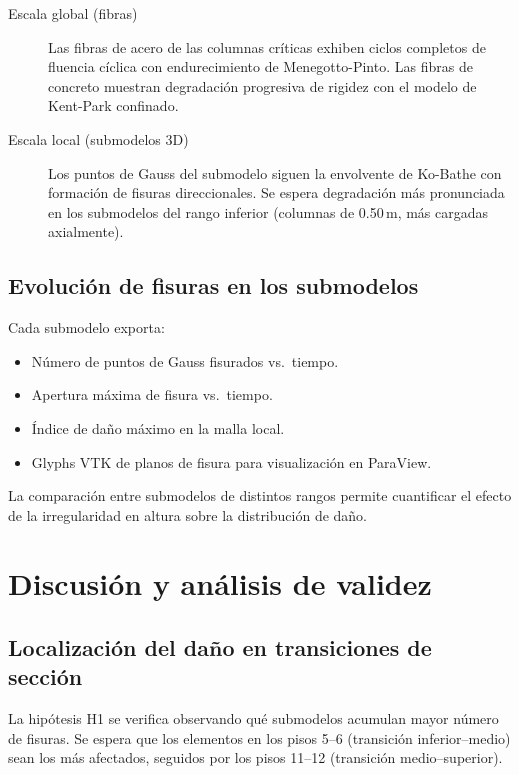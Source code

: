 \begin{description}
  \item[Escala global (fibras)]
    Las fibras de acero de las columnas críticas exhiben ciclos
    completos de fluencia cíclica con endurecimiento de Menegotto-Pinto.
    Las fibras de concreto muestran degradación progresiva de rigidez
    con el modelo de Kent-Park confinado.
  \item[Escala local (submodelos 3D)]
    Los puntos de Gauss del submodelo siguen la envolvente de
    Ko-Bathe con formación de fisuras direccionales.  Se espera
    degradación más pronunciada en los submodelos del rango inferior
    (columnas de 0.50\,m, más cargadas axialmente).
\end{description}

\subsection{Evolución de fisuras en los submodelos}

Cada submodelo exporta:
\begin{itemize}
  \item Número de puntos de Gauss fisurados vs.\ tiempo.
  \item Apertura máxima de fisura vs.\ tiempo.
  \item Índice de daño máximo en la malla local.
  \item Glyphs VTK de planos de fisura para visualización en ParaView.
\end{itemize}

La comparación entre submodelos de distintos rangos permite cuantificar
el efecto de la irregularidad en altura sobre la distribución de daño.


\section{Discusión y análisis de validez}
\label{sec:ms16-discussion}

\subsection{Localización del daño en transiciones de sección}

La hipótesis H1 se verifica observando qué submodelos acumulan mayor
número de fisuras.  Se espera que los elementos en los pisos 5--6
(transición inferior--medio) sean los más afectados, seguidos por
los pisos 11--12 (transición medio--superior).

